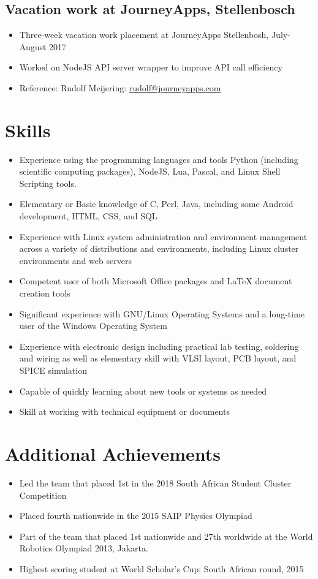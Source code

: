 \documentclass[12pt,a4paper,notitlepage]{article}
\begin{document}
\subsection*{Vacation work at JourneyApps, Stellenbosch}
\begin{itemize}
	\setlength\itemsep{0.02em}
    \item Three-week vacation work placement at JourneyApps Stellenbosh, July-August 2017
    \item Worked on NodeJS API server wrapper to improve API call efficiency
    \item Reference: Rudolf Meijering: \href{mailto:rudolf@journeyapps.com}{rudolf@journeyapps.com}
\end{itemize}

\section*{Skills}
\begin{itemize}
	\setlength\itemsep{0.02em}
    \item Experience using the programming languages and tools Python (including scientific computing packages), NodeJS, Lua, Pascal, and Linux Shell Scripting tools.
    \item Elementary or Basic knowledge of C, Perl, Java, including some Android development, HTML, CSS, and SQL
    \item Experience with Linux system administration and environment management across a variety of distributions and environments, including Linux cluster environments and web servers
    \item Competent user of both Microsoft Office packages and LaTeX document creation tools
    \item Significant experience with GNU/Linux Operating Systems and a long-time user of the Windows Operating System
    \item Experience with electronic design including practical lab testing, soldering and wiring as well as elementary skill with VLSI layout, PCB layout, and SPICE simulation
    \item Capable of quickly learning about new tools or systems as needed
    \item Skill at working with technical equipment or documents
\end{itemize}

\section*{Additional Achievements}
\begin{itemize}
	\setlength\itemsep{0.02em}
    \item Led the team that placed 1st in the 2018 South African Student Cluster Competition
    \item Placed fourth nationwide in the 2015 SAIP Physics Olympiad
    \item Part of the team that placed 1st nationwide and 27th worldwide at the World Robotics Olympiad 2013, Jakarta.
    \item Highest scoring student at World Scholar's Cup: South African round, 2015
\end{itemize}
\end{document}
